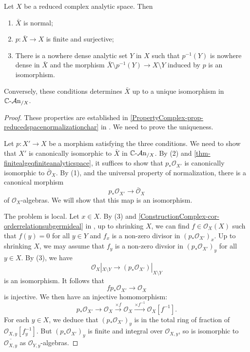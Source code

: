 \begin{corollary}
    Let $X$ be a reduced complex analytic space. Then 
    \begin{enumerate}
        \item $\bar{X}$ is normal;
        \item $p:\bar{X}\rightarrow X$ is finite and surjective;
        \item There is a nowhere dense analytic set $Y$ in $X$ such that $p^{-1}(Y)$ is nowhere dense in $\bar{X}$ and the morphism $\bar{X}\setminus p^{-1}(Y)\rightarrow X\setminus Y$ induced by $p$ is an isomorphism.
    \end{enumerate}
    Conversely, these conditions determines $\bar{X}$ up to a unique isomorphism in $\mathbb{C}\text{-}\mathcal{A}\mathrm{n}_{/X}$.
\end{corollary}
\begin{proof}
    These properties are established in \cref{PropertyComplex-prop-reducedspacenormalizationchar} in . We need to prove the uniqueness.

    Let $p:X'\rightarrow X$ be a morphism satisfying the three conditions. We need to show that $X'$ is canonically isomorphic to $\bar{X}$ in $\mathbb{C}\text{-}\mathcal{A}\mathrm{n}_{/X}$.
    By (2) and \cref{thm-finitealgeqfiniteanalyticspace}, it suffices to show that $p_*\mathcal{O}_{X'}$ is canonically isomorphic to $\bar{\mathcal{O}}_{X}$. By (1), and the universal property of normalization, there is a canonical morphism
    \[
        p_*\mathcal{O}_{X'}\rightarrow \bar{\mathcal{O}}_{X}
    \]
    of $\mathcal{O}_X$-algebras. We will show that this map is an isomorphism.

    The problem is local. Let $x\in X$. By (3) and \cref{ConstructionComplex-cor-orderrelationsubgermideal} in , up to shrinking $X$, we can find $f\in \mathcal{O}_X(X)$ such that $f(y)=0$ for all $y\in Y$ and $f_x$ is a non-zero divisor in $(p_*\mathcal{O}_{X'})_x$. Up to shrinking $X$, we may assume that $f_y$ is a non-zero divsior in $(p_*\mathcal{O}_{X'})_y$ for all $y\in X$. By (3), we have
    \[
        \mathcal{O}_X|_{X\setminus Y}\rightarrow (p_*\mathcal{O}_{X'})|_{X\setminus Y}  
    \]
    is an isomorphism. It follows that 
    \[
        f p_*\mathcal{O}_{X'}\rightarrow \mathcal{O}_X  
    \]
    is injective. We then have an injective homomorphism:
    \[
        p_*\mathcal{O}_{X'}\rightarrow \mathcal{O}_X \xrightarrow{\times f} \mathcal{O}_X\xrightarrow{\times f^{-1}}\mathcal{O}_X[f^{-1}]. 
    \]
    For each $y\in X$, we deduce that $(p_*\mathcal{O}_{X'})_y$ is in the total ring of fraction of $\mathcal{O}_{X,y}[f_y^{-1}]$. But $(p_*\mathcal{O}_{X'})_y$ is finite and integral over $\mathcal{O}_{X,y}$, so is isomorphic to $\overline{\mathcal{O}_{X,y}}$ as $\mathcal{O}_{Y,y}$-algebras. 
\end{proof}

